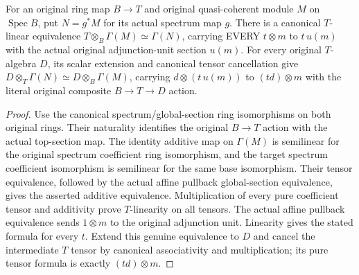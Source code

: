 \begin{lemma}
\label{lem:affine-pullback-sections-tensor-readback}
\leanok
{}
For an original ring map $B\to T$ and original quasi-coherent module
$M$ on $\operatorname{Spec}B$, put $N=g^*M$ for its actual spectrum
map $g$. There is a canonical $T$-linear equivalence
$T\otimes_B\Gamma(M)\simeq\Gamma(N)$, carrying EVERY $t\otimes m$
to $t\,u(m)$ with the actual original adjunction-unit section $u(m)$.
For every original $T$-algebra $D$, its scalar extension and canonical
tensor cancellation give
$D\otimes_T\Gamma(N)\simeq D\otimes_B\Gamma(M)$, carrying
$d\otimes(t\,u(m))$ to $(t d)\otimes m$ with the literal original
composite $B\to T\to D$ action.
\end{lemma}
\begin{proof}
Use the canonical spectrum/global-section ring isomorphisms on both
original rings. Their naturality identifies the original $B\to T$
action with the actual top-section map. The identity additive map on
$\Gamma(M)$ is semilinear for the original spectrum coefficient ring
isomorphism, and the target spectrum coefficient isomorphism is
semilinear for the same base isomorphism. Their tensor equivalence,
followed by the actual affine pullback global-section equivalence,
gives the asserted additive equivalence. Multiplication of every pure
coefficient tensor and additivity prove $T$-linearity on all tensors.
The actual affine pullback equivalence sends $1\otimes m$ to the
original adjunction unit. Linearity gives the stated formula for every
$t$. Extend this genuine equivalence to $D$ and cancel the intermediate
$T$ tensor by canonical associativity and multiplication; its pure
tensor formula is exactly $(td)\otimes m$.
\end{proof}

